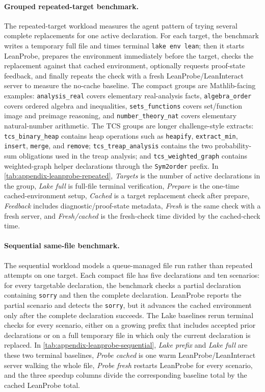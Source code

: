 \documentclass{article}
\begin{document}
\paragraph{Grouped repeated-target benchmark.}
The repeated-target workload measures the agent pattern of trying several complete replacements for one active declaration.
For each target, the benchmark writes a temporary full file and times terminal \texttt{lake env lean}; then it starts LeanProbe, prepares the environment immediately before the target, checks the replacement against that cached environment, optionally requests proof-state feedback, and finally repeats the check with a fresh LeanProbe/LeanInteract server to measure the no-cache baseline.
The compact groups are Mathlib-facing examples: \texttt{analysis\_real} covers elementary real-analysis facts, \texttt{algebra\_order} covers ordered algebra and inequalities, \texttt{sets\_functions} covers set/function image and preimage reasoning, and \texttt{number\_theory\_nat} covers elementary natural-number arithmetic.
The TCS groups are longer challenge-style extracts: \texttt{tcs\_binary\_heap} contains heap operations such as \texttt{heapify}, \texttt{extract\_min}, \texttt{insert}, \texttt{merge}, and \texttt{remove}; \texttt{tcs\_treap\_analysis} contains the two probability-sum obligations used in the treap analysis; and \texttt{tcs\_weighted\_graph} contains weighted-graph helper declarations through the \texttt{Sym2order} prefix.
In \cref{tab:appendix-leanprobe-repeated}, \emph{Targets} is the number of active declarations in the group, \emph{Lake full} is full-file terminal verification, \emph{Prepare} is the one-time cached-environment setup, \emph{Cached} is a target replacement check after prepare, \emph{Feedback} includes diagnostic/proof-state metadata, \emph{Fresh} is the same check with a fresh server, and \emph{Fresh/cached} is the fresh-check time divided by the cached-check time.

\paragraph{Sequential same-file benchmark.}
The sequential workload models a queue-managed file run rather than repeated attempts on one target.
Each compact file has five declarations and ten scenarios: for every targetable declaration, the benchmark checks a partial declaration containing \texttt{sorry} and then the complete declaration.
LeanProbe reports the partial scenario and detects the \texttt{sorry}, but it advances the cached environment only after the complete declaration succeeds.
The Lake baselines rerun terminal checks for every scenario, either on a growing prefix that includes accepted prior declarations or on a full temporary file in which only the current declaration is replaced.
In \cref{tab:appendix-leanprobe-sequential}, \emph{Lake prefix} and \emph{Lake full} are these two terminal baselines, \emph{Probe cached} is one warm LeanProbe/LeanInteract server walking the whole file, \emph{Probe fresh} restarts LeanProbe for every scenario, and the three speedup columns divide the corresponding baseline total by the cached LeanProbe total.
\end{document}
